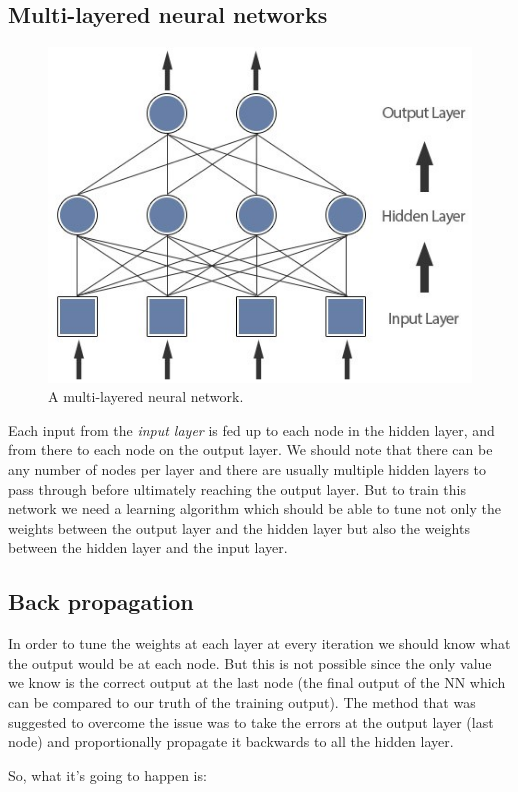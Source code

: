 \subsection{Multi-layered neural
networks}\label{multi-layered-neural-networks}

\begin{figure}
\centering
\includegraphics[width=0.7\linewidth]{figures/multilayer.jpeg}
\caption{A multi-layered neural network.}
\end{figure}

Each input from the \emph{input layer} is fed up to each node in the
hidden layer, and from there to each node on the output layer. We should
note that there can be any number of nodes per layer and there are
usually multiple hidden layers to pass through before ultimately
reaching the output layer. But to train this network we need a learning
algorithm which should be able to tune not only the weights between the
output layer and the hidden layer but also the weights between the
hidden layer and the input layer.

\subsection{Back propagation}\label{back-propagation}

In order to tune the weights at each layer at every iteration we should
know what the output would be at each node. But this is not possible
since the only value we know is the correct output at the last node (the
final output of the NN which can be compared to our truth of the
training output). The method that was suggested to overcome the issue
was to take the errors at the output layer (last node) and
proportionally propagate it backwards to all the hidden layer.

So, what it's going to happen is:


